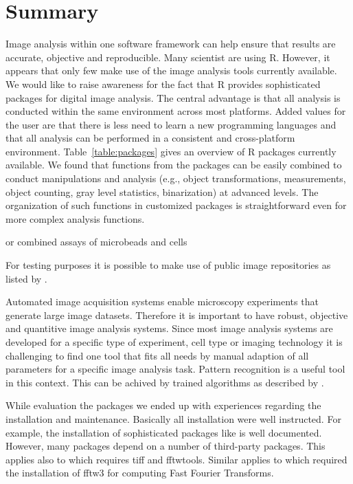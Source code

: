 \section{Summary}

Image analysis within one software framework can help ensure that results are 
accurate, objective and reproducible. Many scientist are using R. However, it 
appears that only few make use of the image analysis tools currently available. 
We would like to raise awareness for the fact that R provides sophisticated 
packages for digital image analysis. The central advantage is that all analysis 
is conducted within the same environment across most  platforms. Added values 
for the user are that there is less need to learn a new programming languages 
and that all analysis can be performed in a consistent and cross-platform 
environment. Table~\ref{table:packages} gives an overview of R packages 
currently available. We found that functions from the packages can be easily 
combined to conduct manipulations and analysis (e.g., object transformations, 
measurements, object counting, gray level statistics, binarization) at advanced 
levels. The organization of such functions in customized packages is 
straightforward even for more complex analysis functions.

\citep{rodiger_intestinal_2015} or combined assays of microbeads and cells 
\citep{scholz_second_2015, grossmann_simultaneous_2016}

For testing purposes it is possible to make use of public image repositories as 
listed by \citet{eliceiri_biological_2012}.

Automated image acquisition systems enable microscopy experiments that generate 
large image datasets. Therefore it is important to have robust, objective and 
quantitive image analysis systems. Since most image analysis systems are 
developed for a specific type of experiment, cell type or imaging technology it 
is challenging to find one tool that fits all needs by manual adaption of all 
parameters for a specific image analysis task. Pattern recognition is a useful 
tool in this context. This can be achived by trained algorithms as described by 
\citet{shamir_pattern_2010}. 

While evaluation the packages we ended up with experiences regarding the 
installation and maintenance. Basically all installation were well instructed. 
For example, the installation of sophisticated packages like  
is 
well documented. However, many packages depend on a number of third-party 
packages. This applies also to  which requires tiff and 
fftwtools. Similar applies to  which required the installation 
of fftw3 for computing Fast Fourier Transforms.

